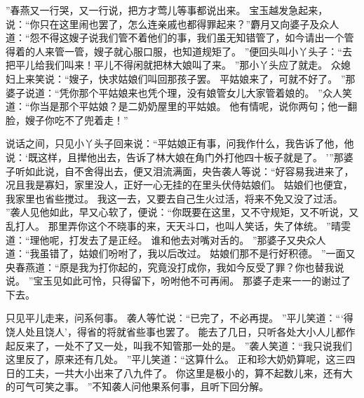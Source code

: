 ”春燕又一行哭，又一行说，把方才莺儿等事都说出来。
宝玉越发急起来，说：“你只在这里闹也罢了，怎么连亲戚也都得罪起来？”麝月又向婆子及众人道：“怨不得这嫂子说我们管不着他们的事，我们虽无知错管了，如今请出一个管得着的人来管一管，嫂子就心服口服，也知道规矩了。
”便回头叫小丫头子：“去把平儿给我们叫来！平儿不得闲就把林大娘叫了来。
”那小丫头应了就走。
众媳妇上来笑说：“嫂子，快求姑娘们叫回那孩子罢。
平姑娘来了，可就不好了。
”那婆子说道：“凭你那个平姑娘来也凭个理，没有娘管女儿大家管着娘的。
”众人笑道：“你当是那个平姑娘？是二奶奶屋里的平姑娘。
他有情呢，说你两句；他一翻脸，嫂子你吃不了兜着走！”\par
说话之间，只见小丫头子回来说：“平姑娘正有事，问我作什么，我告诉了他，他说：‘既这样，且撵他出去，告诉了林大娘在角门外打他四十板子就是了。
’”那婆子听如此说，自不舍得出去，便又泪流满面，央告袭人等说：“好容易我进来了，况且我是寡妇，家里没人，正好一心无挂的在里头伏侍姑娘们。
姑娘们也便宜，我家里也省些搅过。
我这一去，又要去自己生火过活，将来不免又没了过活。
”袭人见他如此，早又心软了，便说：“你既要在这里，又不守规矩，又不听说，又乱打人。
那里弄你这个不晓事的来，天天斗口，也叫人笑话，失了体统。
”晴雯道：“理他呢，打发去了是正经。
谁和他去对嘴对舌的。
”那婆子又央众人道：“我虽错了，姑娘们吩咐了，我以后改过。
姑娘们那不是行好积德。
”一面又央春燕道：“原是我为打你起的，究竟没打成你，我如今反受了罪？你也替我说说。
”宝玉见如此可怜，只得留下，吩咐他不可再闹。
那婆子走来一一的谢过了下去。
\par
只见平儿走来，问系何事。
袭人等忙说：“已完了，不必再提。
”平儿笑道：“‘得饶人处且饶人’，得省的将就省些事也罢了。
能去了几日，只听各处大小人儿都作起反来了，一处不了又一处，叫我不知管那一处的是。
”袭人笑道：“我只说我们这里反了，原来还有几处。
”平儿笑道：“这算什么。
正和珍大奶奶算呢，这三四日的工夫，一共大小出来了八九件了。
你这里是极小的，算不起数儿来，还有大的可气可笑之事。
”不知袭人问他果系何事，且听下回分解。
\par
{}
